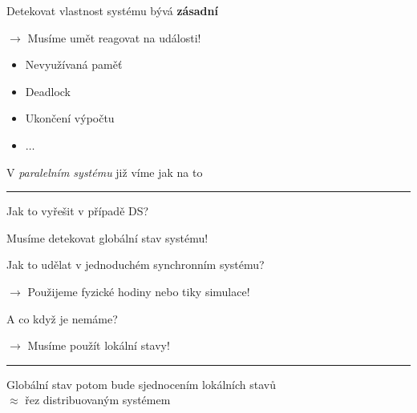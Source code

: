 \documentclass[usenames,dvipsnames,9pt]{beamer}
\begin{document}
\begin{frame}
Detekovat vlastnost systému bývá {\bf zásadní}

\hfill $\rightarrow$ Musíme umět reagovat na události!

\vspace{2em}
\begin{itemize}
\item Nevyužívaná paměť
\item Deadlock
\item Ukončení výpočtu
\item $\dots$
\end{itemize}

\vspace{2em}

V \emph{paralelním systému} již víme jak na to

 \pause\vspace{2em}\hrule\vspace{2em}

  \begin{center}
    \LARGE Jak to vyřešit v případě DS?
  \end{center}
\end{frame}

\begin{frame}
  \begin{center}
    \LARGE Musíme detekovat globální stav systému!
  \end{center}

  \vspace{2em}

  Jak to udělat v jednoduchém synchronním systému?

  \pause\hfill $\rightarrow$ Použijeme fyzické hodiny nebo tiky simulace!

A co když je nemáme?

    \pause\hfill $\rightarrow$ Musíme použít lokální stavy!

      \vspace{2em}\hrule\vspace{2em}

      \begin{center}
    \LARGE Globální stav potom bude sjednocením lokálních stavů\\ $\approx$  řez distribuovaným systémem
  \end{center}

\end{frame}
\end{document}
